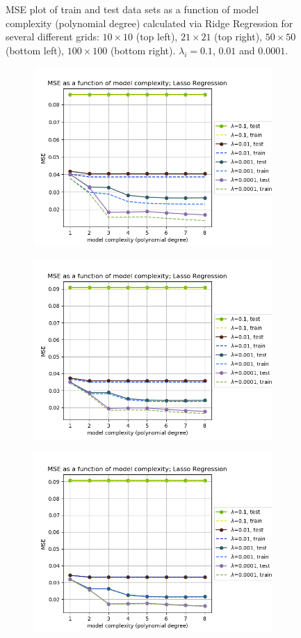 \begin{figure}[!htbp]
\begin{subfigure}{\textwidth}
\end{subfigure}
\caption{MSE plot of train and test data sets as a function of model complexity (polynomial degree) calculated via Ridge Regression for several different grids: $10\times10$ (top left), $21\times21$ (top right), $50\times50$ (bottom left), $100\times100$ (bottom right). $\lambda_i = 0.1$, $0.01$ and $0.0001$.}
\label{fig:ridge-mse}
\end{figure}

\begin{figure}[!htbp]
\begin{subfigure}{\textwidth}
  \centering
  \includegraphics[width=0.55\linewidth]{images/mse/fake_lasso_mse_p08_n10.png}
\end{subfigure}
\begin{subfigure}{\textwidth}
  \centering
  \includegraphics[width=0.55\linewidth]{images/mse/fake_lasso_mse_p08_n21.png}
\end{subfigure}
\begin{subfigure}{\textwidth}
  \centering
  \includegraphics[width=0.55\linewidth]{images/mse/fake_lasso_mse_p08_n50.png}

\end{subfigure}
\end{figure}
